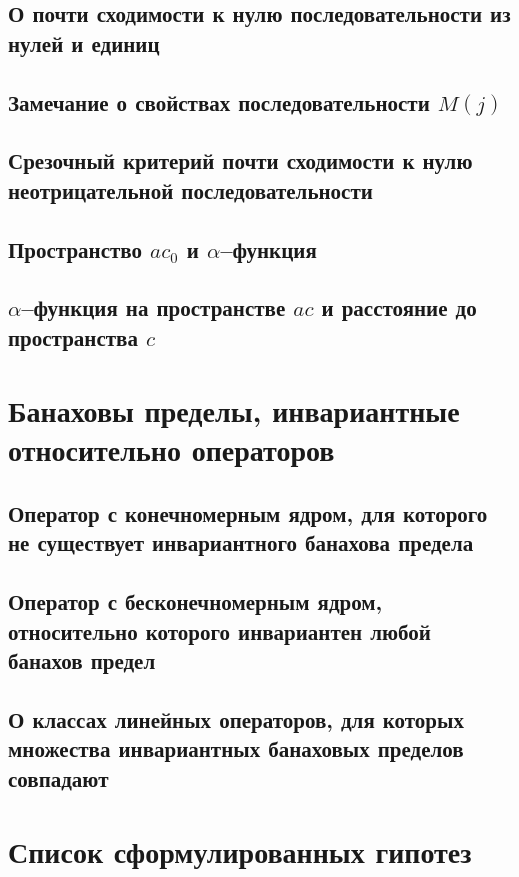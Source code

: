 \documentclass[a4paper,openbib]{report}
\theoremstyle{definition}
\newcommand\hypotlist{ }
\begin{document}
	\section{О почти сходимости к нулю последовательности из нулей и единиц}
	

	\section{Замечание о свойствах последовательности $M(j)$}
	

	\section{Срезочный критерий почти сходимости к нулю неотрицательной последовательности}
	

	\section{Пространство $ac_0$ и $\alpha$--функция}
	

	\section{$\alpha$--функция на пространстве $ac$ и расстояние до пространства $c$}
	

\chapter{Банаховы пределы, инвариантные относительно операторов}

	\section{Оператор с конечномерным ядром, для которого не существует инвариантного банахова предела}
	

	\section{Оператор с бесконечномерным ядром, относительно которого инвариантен любой банахов предел}
	

	\section{О классах линейных операторов, для которых множества инвариантных банаховых пределов совпадают}
	

\chapter*{Список сформулированных гипотез}

\renewcommand\label[1]{}
\hypotlist


\printbibliography{}
\end{document}
